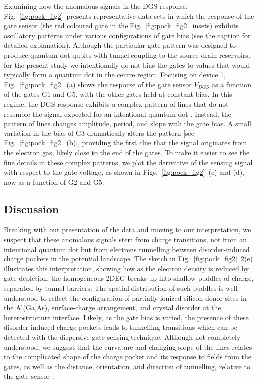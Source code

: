 Examining now the anomalous signals in the DGS response, Fig.~\ref{fig:pock_fig2}~presents representative data sets in which the response of the gate sensor (the red coloured gate in the Fig.~\ref{fig:pock_fig2}~insets) exhibits oscillatory patterns under various configurations of gate bias (see the caption for detailed explanation). Although the particular gate pattern was designed to produce quantum-dot qubits with tunnel coupling to the source-drain reservoirs, for the present study we intentionally do not bias the gates to values that would typically form a quantum dot in the centre region. Focusing on device 1, Fig.~\ref{fig:pock_fig2}~(a) shows the response of the gate sensor $V_{DGS}$ as a function of the gates G1 and G5, with the other gates held at constant bias. In this regime, the DGS response exhibits a complex pattern of lines that do not resemble the signal expected for an intentional quantum dot \cite{PhysRevLett.110.046805}. Instead, the pattern of lines changes amplitude, period, and slope with the gate bias. A small variation in the bias of G3 dramatically alters the pattern [see Fig.~\ref{fig:pock_fig2}~(b)], providing the first clue that the signal originates from the electron gas, likely close to the end of the gates. To make it easier to see the fine details in these complex patterns, we plot the derivative of the sensing signal with respect to the gate voltage, as shown in Figs.~\ref{fig:pock_fig2}~(c) and (d), now as a function of G2 and G5.

\subsection{Discussion}
Breaking with our presentation of the data and moving to our interpretation, we suspect that these anomalous signals stem from charge transitions, not from an intentional quantum dot but from electrons tunnelling between disorder-induced charge pockets in the potential landscape. The sketch in Fig.~\ref{fig:pock_fig2}~2(e) illustrates this interpretation, showing how as the electron density is reduced by gate depletion, the homogeneous 2DEG breaks up into shallow puddles of charge, separated by tunnel barriers. The spatial distribution of such puddles is well understood \cite{PhysRevB.41.7929,Ilani1354} to reflect the configuration of partially ionized silicon donor sites in the Al(Ga,As), surface-charge arrangement, and crystal disorder at the heterostructure interface. Likely, as the gate bias is varied, the presence of these disorder-induced charge pockets leads to tunnelling transitions which can be detected with the dispersive gate sensing technique. Although not completely understood, we suggest that the curvature and changing slope of the lines relates to the complicated shape of the charge pocket and its response to fields from the gates, as well as the distance, orientation, and direction of tunnelling, relative to the gate sensor \cite{Ilani1354}.

